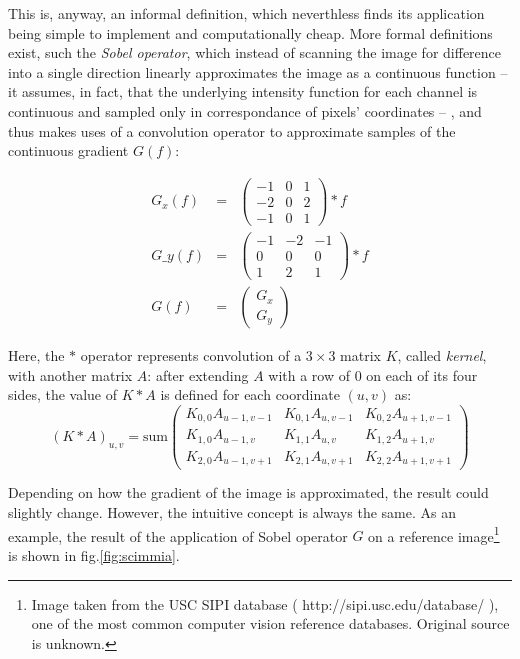 This is, anyway, an informal definition, which neverthless finds its
application being simple to implement and computationally cheap. More formal
definitions exist, such the \emph{Sobel operator}, which instead of scanning the
image for difference into a single direction linearly approximates the image as
a continuous function -- it assumes, in fact, that the underlying intensity
function for each channel is continuous
and sampled only in correspondance of pixels' coordinates -- , and thus makes
uses of a convolution operator to approximate samples of the continuous
gradient $G(f)$:

\begin{eqnarray}
  G_x(f) &=& \begin{pmatrix} 
      -1 & 0 & 1 \\
      -2 & 0 & 2 \\
      -1 & 0 & 1 \end{pmatrix}
  \ast f \\
  G\_y(f) &=& \begin{pmatrix} 
      -1 & -2 & -1 \\
      0 & 0 & 0 \\
      1 & 2 & 1 \end{pmatrix}
  \ast f  \\
  G(f) & = & \begin{pmatrix} G_x \\ G_y \end{pmatrix}
\end{eqnarray}

Here, the $\ast$ operator represents convolution of a $3\times 3$ matrix $K$, called
\emph{kernel}, with another matrix $A$: after extending $A$ with a row of $0$ on
each of its four sides, the value of $K\ast A$ is defined for each coordinate
$(u,v)$ as:
\begin{equation}
  (K \ast A)_{u,v} = \text{sum}\begin{pmatrix}
    K_{0,0}A_{u-1,v-1} & 
    K_{0,1}A_{u,v-1} & 
    K_{0,2}A_{u+1,v-1} \\ 
    K_{1,0}A_{u-1,v} & 
    K_{1,1}A_{u,v} & 
    K_{1,2}A_{u+1,v} \\ 
    K_{2,0}A_{u-1,v+1} & 
    K_{2,1}A_{u,v+1} & 
    K_{2,2}A_{u+1,v+1}  
  \end{pmatrix}
\end{equation}

Depending on how the gradient of the image is approximated, the result could
slightly change. However, the intuitive concept is always the same. As an
example, the result of the application of Sobel operator $G$ on a reference
image\footnote{Image taken from the USC SIPI database
  ( http://sipi.usc.edu/database/ ), one of the most common computer vision reference
databases. Original source is unknown.}
 is shown in fig.\ref{fig:scimmia}.

